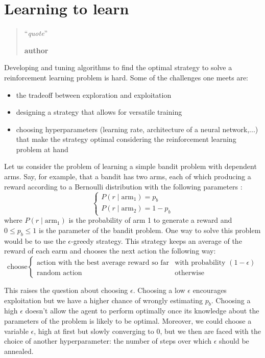 \chapter{Learning to learn}
\begin{quotation}
\noindent ``\emph{quote}''
\begin{flushright}\textbf{author}\end{flushright}
\end{quotation}

\vspace*{0.5cm}

Developing and tuning algorithms to find the optimal strategy to solve a
reinforcement learning problem is hard. Some of the challenges one meets are:
\begin{itemize}
	\item the tradeoff between exploration and exploitation
	\item designing a strategy that allows for versatile training
	\item choosing hyperparameters (learning rate, architecture of a
		neural network,...)  that make the strategy
		optimal considering the reinforcement learning problem at hand
\end{itemize}

Let us consider the problem of learning a simple bandit problem with dependent
arms. Say, for example, that a bandit has two arms, each of which producing
a reward according to a Bernoulli distribution with the following parameters :
$$ \begin{cases} P(r \mid \text{arm}_1) = p_b \\ 
P(r \mid \text{arm}_2) = 1 - p_b  \end{cases} $$
where $P(r \mid \text{arm}_1)$ is the probability of arm 1 to generate a reward
and $0 \leq p_b \leq 1$ is the parameter of the bandit problem. One way to
solve this problem would be to use the $\epsilon$-greedy strategy. This
strategy keeps an average of the reward of each earm and chooses the next
action the following way:
$$ \text{choose} \begin{cases}
	\text{action with the best average reward so far} & \text{with probability } (1-\epsilon) 
	\\
	\text{random action} & \text{otherwise}
\end{cases}
$$

This raises the question about choosing $\epsilon$. Choosing a low $\epsilon$
encourages exploitation but we have a higher chance of wrongly estimating $p_b$.
Choosing a high $\epsilon$ doesn't allow the agent to perform optimally once
its knowledge about the parameters of the problem is likely to be optimal.
Moreover, we could choose a variable $\epsilon$, high at first but slowly
converging to 0, but we then are faced with the choice of another
hyperparameter: the number of steps over which $\epsilon$ should be annealed.\\

